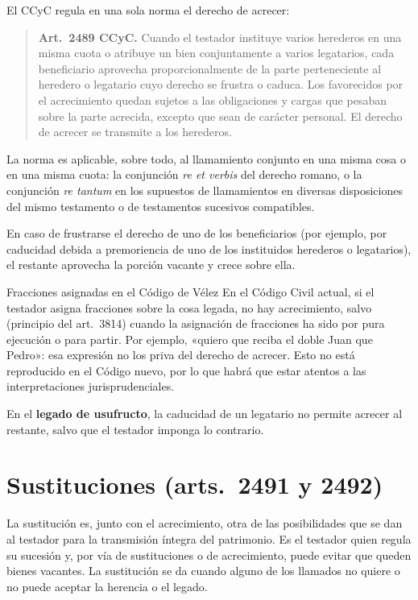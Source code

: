 \documentclass[12pt,oneside]{book}
\begin{document}
El CCyC regula en una sola norma el derecho de acrecer:

\begin{quote}
\textbf{Art.~2489 CCyC.} Cuando el testador instituye varios herederos en una misma cuota o atribuye un bien conjuntamente a varios legatarios, cada beneficiario aprovecha proporcionalmente de la parte perteneciente al heredero o legatario cuyo derecho se frustra o caduca. Los favorecidos por el acrecimiento quedan sujetos a las obligaciones y cargas que pesaban sobre la parte acrecida, excepto que sean de carácter personal. El derecho de acrecer se transmite a los herederos.
\end{quote}

La norma es aplicable, sobre todo, al llamamiento conjunto en una misma cosa o en una misma cuota: la conjunción \emph{re et verbis} del derecho romano, o la conjunción \emph{re tantum} en los supuestos de llamamientos en diversas disposiciones del mismo testamento o de testamentos sucesivos compatibles.

En caso de frustrarse el derecho de uno de los beneficiarios (por ejemplo, por caducidad debida a premoriencia de uno de los instituidos herederos o legatarios), el restante aprovecha la porción vacante y crece sobre ella.

\begin{example}{Fracciones asignadas en el Código de Vélez}
En el Código Civil actual, si el testador asigna fracciones sobre la cosa legada, no hay acrecimiento, salvo (principio del art.~3814) cuando la asignación de fracciones ha sido por pura ejecución o para partir. Por ejemplo, «quiero que reciba el doble Juan que Pedro»: esa expresión no los priva del derecho de acrecer. Esto no está reproducido en el Código nuevo, por lo que habrá que estar atentos a las interpretaciones jurisprudenciales.
\end{example}

En el \textbf{legado de usufructo}, la caducidad de un legatario no permite acrecer al restante, salvo que el testador imponga lo contrario.

\section{Sustituciones (arts.~2491 y 2492)}

La sustitución es, junto con el acrecimiento, otra de las posibilidades que se dan al testador para la transmisión íntegra del patrimonio. Es el testador quien regula su sucesión y, por vía de sustituciones o de acrecimiento, puede evitar que queden bienes vacantes. La sustitución se da cuando alguno de los llamados no quiere o no puede aceptar la herencia o el legado.
\end{document}

